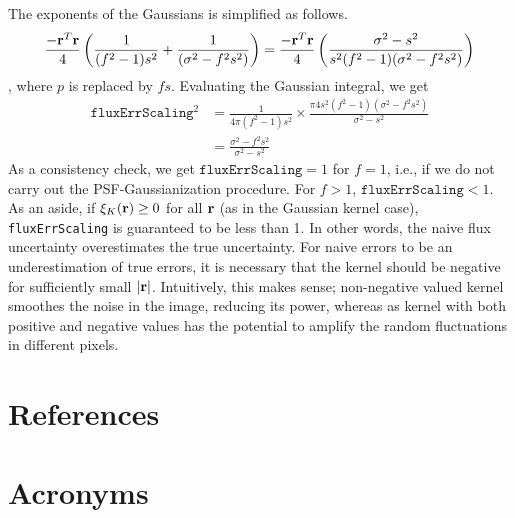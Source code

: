 \documentclass[DM,lsstdraft, authoryear,toc]{lsstdoc}
\begin{document}
The exponents of the Gaussians is simplified as follows.
\begin{equation}
  \frac{{-\bf r}^T{\bf r}}{4}\left(\frac{1}{(f^2-1)s^2} + \frac{1}{(\sigma^2-f^2s^2)} \right)
  = \frac{{-\bf r}^T{\bf r}}{4}\left( \frac{\sigma^2 - s^2}{s^2(f^2-1)(\sigma^2-f^2s^2)} \right)
\end{equation},
where $p$ is replaced by $fs$. Evaluating the Gaussian integral, we get
\begin{align}
  \texttt{fluxErrScaling}^2 &= \frac{1}{4\pi (f^2-1)s^2} \times \frac{\pi 4s^2(f^2-1)(\sigma^2-f^2s^2)}{\sigma^2-s^2} \\
  &= \frac{\sigma^2-f^2s^2}{\sigma^2-s^2}
\end{align}
As a consistency check, we get $\texttt{fluxErrScaling} = 1$ for $f=1$, i.e., if we do not carry out the PSF-Gaussianization procedure. For $f>1$, $\texttt{fluxErrScaling} < 1$. As an aside, if $\xi_K({\bf r}) \ge 0$ for all ${\bf r}$ (as in the Gaussian kernel case), \texttt{fluxErrScaling} is guaranteed to be less than 1. In other words, the naive flux uncertainty overestimates the true uncertainty. For naive errors to be an underestimation of true errors, it is necessary that the kernel should be negative for sufficiently small $|{\bf r}|$. Intuitively, this makes sense; non-negative valued kernel smoothes the noise in the image, reducing its power, whereas as kernel with both positive and negative values has the potential to amplify the random fluctuations in different pixels.

\appendix
\section{References} \label{sec:bib}
\renewcommand{\refname}{} %


\section{Acronyms} \label{sec:acronyms}

\end{document}
